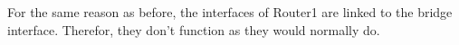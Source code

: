 For the same reason as before, the interfaces of Router1 are linked to the bridge interface. Therefor, they don't function as they would normally do.
